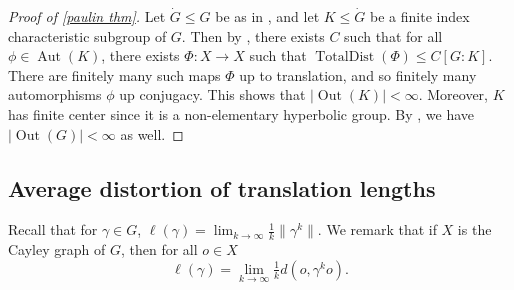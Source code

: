 \documentclass{amsart}
\numberwithin{equation}{section}
\theoremstyle{definition}
\DeclareMathOperator{\Aut}{Aut}
\DeclareMathOperator{\Out}{Out}
\DeclareMathOperator{\TD}{TotalDist}
\begin{document}
\begin{proof}[Proof of \cref{paulin thm}]
Let $\dot G\le G$ be as in , and let $K\le \dot G$ be a finite index characteristic subgroup of $G$. Then by , there exists $C$ such that for all $\phi\in \Aut(K)$, there exists $\Phi:X\to X$ such that $\TD(\Phi) \le C[G:K]$. There are finitely many such maps $\Phi$ up to translation, and so finitely many automorphisms $\phi$ up conjugacy.
This shows that $|\Out(K)|<\infty$. 
Moreover, $K$ has finite center since it is a non-elementary hyperbolic group. 
By , we have $|\Out(G)|<\infty$ as well.
\end{proof}

\subsection{Average distortion of translation lengths}
Recall that for $\gamma\in G$, $\ell(\gamma)=\lim_{k\to \infty}\tfrac 1k \|\gamma^k\|$. We remark that if $X$ is the Cayley graph of $G$, then for all $o\in X$
\begin{equation}\label{eq: general translation length equality}
    \ell(\gamma)=\lim_{k\to \infty} \tfrac 1k d(o,\gamma^ko).
\end{equation}
\end{document}
